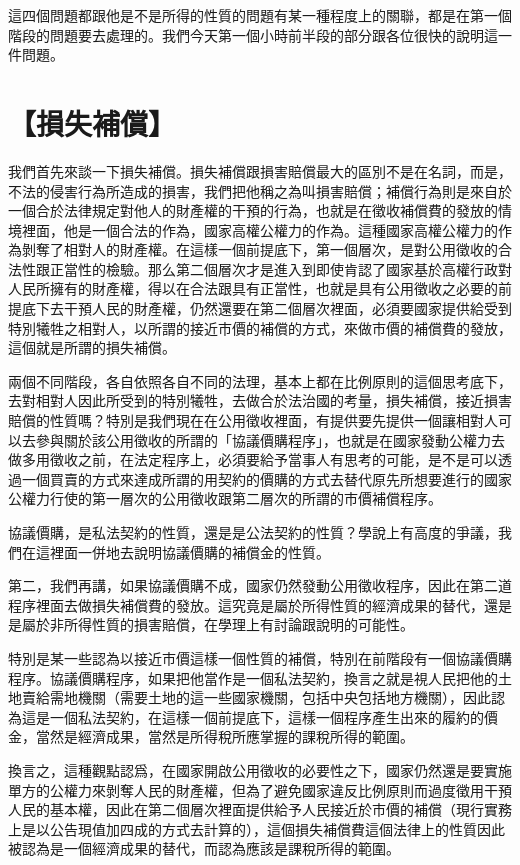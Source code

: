 \documentclass[]{ctexbook}
\begin{document}
這四個問題都跟他是不是所得的性質的問題有某一種程度上的關聯，都是在第一個階段的問題要去處理的。我們今天第一個小時前半段的部分跟各位很快的說明這一件問題。

\hypertarget{ux640dux5931ux88dcux511f}{%
\section{【損失補償】}\label{ux640dux5931ux88dcux511f}}

我們首先來談一下損失補償。損失補償跟損害賠償最大的區別不是在名詞，而是，不法的侵害行為所造成的損害，我們把他稱之為叫損害賠償；補償行為則是來自於一個合於法律規定對他人的財產權的干預的行為，也就是在徵收補償費的發放的情境裡面，他是一個合法的作為，國家高權公權力的作為。這種國家高權公權力的作為剝奪了相對人的財產權。在這樣一個前提底下，第一個層次，是對公用徵收的合法性跟正當性的檢驗。那么第二個層次才是進入到即使肯認了國家基於高權行政對人民所擁有的財產權，得以在合法跟具有正當性，也就是具有公用徵收之必要的前提底下去干預人民的財產權，仍然還要在第二個層次裡面，必須要國家提供給受到特別犧牲之相對人，以所謂的接近市價的補償的方式，來做市價的補償費的發放，這個就是所謂的損失補償。

兩個不同階段，各自依照各自不同的法理，基本上都在比例原則的這個思考底下，去對相對人因此所受到的特別犧牲，去做合於法治國的考量，損失補償，接近損害賠償的性質嗎？特別是我們現在在公用徵收裡面，有提供要先提供一個讓相對人可以去參與關於該公用徵收的所謂的「協議價購程序」，也就是在國家發動公權力去做多用徵收之前，在法定程序上，必須要給予當事人有思考的可能，是不是可以透過一個買賣的方式來達成所謂的用契約的價購的方式去替代原先所想要進行的國家公權力行使的第一層次的公用徵收跟第二層次的所謂的市價補償程序。

協議價購，是私法契約的性質，還是是公法契約的性質？學說上有高度的爭議，我們在這裡面一併地去說明協議價購的補償金的性質。

第二，我們再講，如果協議價購不成，國家仍然發動公用徵收程序，因此在第二道程序裡面去做損失補償費的發放。這究竟是屬於所得性質的經濟成果的替代，還是是屬於非所得性質的損害賠償，在學理上有討論跟說明的可能性。

特別是某一些認為以接近市價這樣一個性質的補償，特別在前階段有一個協議價購程序。協議價購程序，如果把他當作是一個私法契約，換言之就是視人民把他的土地賣給需地機關（需要土地的這一些國家機關，包括中央包括地方機關），因此認為這是一個私法契約，在這樣一個前提底下，這樣一個程序產生出來的履約的價金，當然是經濟成果，當然是所得稅所應掌握的課稅所得的範圍。

換言之，這種觀點認爲，在國家開啟公用徵收的必要性之下，國家仍然還是要實施單方的公權力來剝奪人民的財產權，但為了避免國家違反比例原則而過度徵用干預人民的基本權，因此在第二個層次裡面提供給予人民接近於市價的補償（現行實務上是以公告現值加四成的方式去計算的），這個損失補償費這個法律上的性質因此被認為是一個經濟成果的替代，而認為應該是課稅所得的範圍。
\end{document}
